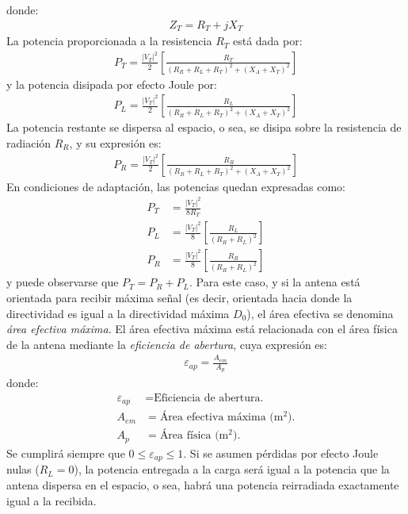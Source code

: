 donde:
\begin{align}
Z_T = R_T + jX_T
\label{ec_intro:47}
\end{align}
La potencia proporcionada a la resistencia $R_T$ está dada por:
\begin{align}
P_T = \frac{\left|V_T\right|^2}{2}\left[\frac{R_T}{\left(R_R + R_L + R_T\right)^2 + \left(X_A + X_T\right)^2}\right]
\label{ec_intro:48}
\end{align}
y la potencia disipada por efecto Joule por:
\begin{align}
P_L = \frac{\left|V_T\right|^2}{2}\left[\frac{R_L}{\left(R_R + R_L + R_T\right)^2 + \left(X_A + X_T\right)^2}\right]
\label{ec_intro:49}
\end{align}
La potencia restante se dispersa al espacio, o sea, se disipa sobre la resistencia de radiación $R_R$, y su expresión es:
\begin{align}
P_R = \frac{\left|V_T\right|^2}{2}\left[\frac{R_R}{\left(R_R + R_L + R_T\right)^2 + \left(X_A + X_T\right)^2}\right]
\label{ec_intro:50}
\end{align}
En condiciones de adaptación, las potencias quedan expresadas como:
\begin{align}
P_T &= \frac{\left|V_T\right|^2}{8R_T}
\label{ec_intro:51}\\
P_L &= \frac{\left|V_T\right|^2}{8}\left[\frac{R_L}{\left(R_R + R_L\right)^2}\right]
\label{ec_intro:52}\\
P_R &= \frac{\left|V_T\right|^2}{8}\left[\frac{R_R}{\left(R_R + R_L\right)^2}\right]
\label{ec_intro:53}
\end{align}
y puede observarse que $P_T = P_R + P_L$. Para este caso, y si la antena está orientada para recibir máxima señal (es decir, orientada hacia donde la directividad es igual a la directividad máxima $D_0$), el área efectiva se denomina \emph{área efectiva máxima}. El área efectiva máxima está relacionada con el área física de la antena mediante la \emph{eficiencia de abertura}, cuya expresión es:
\begin{align}
\varepsilon_{ap} = \frac{A_{em}}{A_p}
\label{ec_intro:54}
\end{align}
donde:
\begin{align*}
\varepsilon_{ap} &= \text{Eficiencia de abertura.}\\
A_{em} &= \text{Área efectiva máxima (m$^2$).}\\
A_p &= \text{Área física (m$^2$).}
\end{align*}
Se cumplirá siempre que $0 \leq\varepsilon_{ap}\leq 1$. Si se asumen pérdidas por efecto Joule nulas ($R_L = 0$), la potencia entregada a la carga será igual a la potencia que la antena dispersa en el espacio, o sea, habrá una potencia reirradiada exactamente igual a la recibida.

